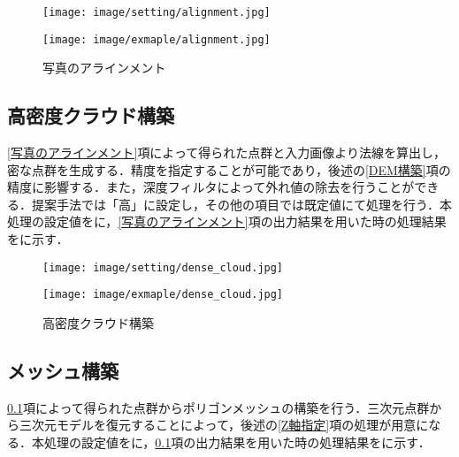       \begin{figure}[t]
        \begin{minipage}[c]{0.45\hsize}
          \centering
          \texttt{[image: image/setting/alignment.jpg]}
          \label{写真のアラインメント設定値}
        \end{minipage}
        \begin{minipage}[c]{0.45\hsize}
          \centering
          \texttt{[image: image/exmaple/alignment.jpg]}
          \label{写真のアラインメント結果}
        \end{minipage}
        \caption{写真のアラインメント}
      \end{figure}

    \subsection{高密度クラウド構築}
      \label{高密度クラウド構築}
      \ref{写真のアラインメント}項によって得られた点群と入力画像より法線を算出し，密な点群を生成する．精度を指定することが可能であり，後述の\ref{DEM構築}項の精度に影響する．また，深度フィルタによって外れ値の除去を行うことができる．提案手法では「高」に設定し，その他の項目では既定値にて処理を行う．本処理の設定値をに，\ref{写真のアラインメント}項の出力結果を用いた時の処理結果をに示す．

      \begin{figure}[t]
        \begin{minipage}[c]{0.45\hsize}
          \centering
          \texttt{[image: image/setting/dense\_cloud.jpg]}
          \label{高密度クラウド構築設定値}
        \end{minipage}
        \begin{minipage}[c]{0.45\hsize}
          \centering
          \texttt{[image: image/exmaple/dense\_cloud.jpg]}
          \label{高密度クラウド構築結果}
        \end{minipage}
        \caption{高密度クラウド構築}
      \end{figure}

    \subsection{メッシュ構築}
      \label{メッシュ構築}
      \ref{高密度クラウド構築}項によって得られた点群からポリゴンメッシュの構築を行う．三次元点群から三次元モデルを復元することによって，後述の\ref{Z軸指定}項の処理が用意になる．本処理の設定値をに，\ref{高密度クラウド構築}項の出力結果を用いた時の処理結果をに示す．

